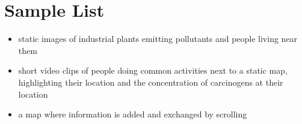 \section{Sample List}
\label{sec:list}

\begin{itemize}
    \item static images of industrial plants emitting pollutants and people living near them
    \item short video clips of people doing common activities next to a static map, highlighting their location and the concentration of carcinogens at their location
    \item a map where information is added and exchanged by scrolling
\end{itemize}
